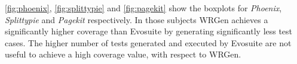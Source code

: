 \autoref{fig:phoenix}, \autoref{fig:splittypie} and \autoref{fig:pagekit} show the boxplots for \textit{Phoenix}, \textit{Splittypie} and \textit{Pagekit} respectively. In those subjects WRGen achieves a significantly higher coverage than Evosuite by generating significantly less test cases. The higher number of tests generated and executed by Evosuite are not useful to achieve a high coverage value, with respect to WRGen.

\newpage